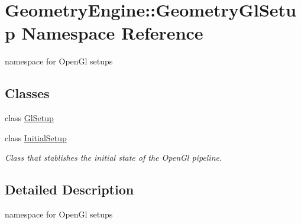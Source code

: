 \hypertarget{namespace_geometry_engine_1_1_geometry_gl_setup}{}\section{Geometry\+Engine\+::Geometry\+Gl\+Setup Namespace Reference}
\label{namespace_geometry_engine_1_1_geometry_gl_setup}


namespace for Open\+Gl setups  


\subsection*{Classes}
\begin{DoxyCompactItemize}
\item 
class \mbox{\hyperlink{class_geometry_engine_1_1_geometry_gl_setup_1_1_gl_setup}{Gl\+Setup}}
\item 
class \mbox{\hyperlink{class_geometry_engine_1_1_geometry_gl_setup_1_1_initial_setup}{Initial\+Setup}}
\begin{DoxyCompactList}\small\item\em Class that stablishes the initial state of the Open\+Gl pipeline. \end{DoxyCompactList}\end{DoxyCompactItemize}


\subsection{Detailed Description}
namespace for Open\+Gl setups 